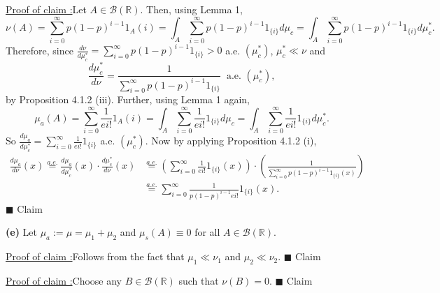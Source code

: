 \documentclass[12pt]{article}
\newcounter{ProofCounter}
\newcounter{ClaimCounter}[ProofCounter]
\newenvironment{claim}[1]{\stepcounter{ClaimCounter}\par\noindent\underline{Claim \theClaimCounter:}\space#1}{}
\newenvironment{claimproof}[1]{\par\noindent\underline{Proof of claim \theClaimCounter:}\space#1}{\hfill $\blacksquare$ Claim \theClaimCounter\vspace{5mm}}
\begin{document}
\begin{claimproof}
Let $A \in \mathcal{B}(\mathbb{R})$. Then, using Lemma 1,
\[ \nu(A) = \sum_{i=0}^{\infty}p(1-p)^{i-1}1_{A}(i) = \int_{A}\sum_{i=0}^{\infty}p(1-p)^{i-1}1_{\{i\}}d\mu_{c} =
\int_{A}\sum_{i=0}^{\infty}p(1-p)^{i-1}1_{\{i\}}d\mu_{c}^{*}. \]
Therefore, since $\frac{d\nu}{d\mu_{c}^{*}} = \sum_{i=0}^{\infty}p(1-p)^{i-1}1_{\{i\}} > 0$ a.e. $(\mu_{c}^{*})$, $\mu_{c}^{*} \ll \nu$ and 
\[ \frac{d\mu_{c}^{*}}{d\nu} = \frac{1}{\sum_{i=0}^{\infty}p(1-p)^{i-1}1_{\{i\}}} \ \text{ a.e. } (\mu_{c}^{*}), \]
by Proposition 4.1.2 (iii). Further, using Lemma 1 again,
\[ \mu_{a}(A) = \sum_{i=0}^{\infty}\frac{1}{ei!}1_{A}(i) = \int_{A}\sum_{i=0}^{\infty}\frac{1}{ei!}1_{\{i\}}d\mu_{c} =
\int_{A}\sum_{i=0}^{\infty}\frac{1}{ei!}1_{\{i\}}d\mu_{c}^{*}. \]
So $\frac{d\mu_{a}}{d\mu_{c}^{*}} = \sum_{i=0}^{\infty}\frac{1}{ei!}1_{\{i\}}$ a.e. $(\mu_{c}^{*})$. Now by applying Proposition 4.1.2 (i),
\begin{align*}
\frac{d\mu_{a}}{d\nu}(x) \stackrel{a.e.}{=} \frac{d\mu_{a}}{d\mu_{c}^{*}}(x)\cdot \frac{d\mu_{c}^{*}}{d\nu}(x) & \stackrel{a.e.}{=} 
\left( \sum_{i=0}^{\infty}\frac{1}{ei!}1_{\{i\}}(x) \right)\cdot \left( \frac{1}{\sum_{i=0}^{\infty}p(1-p)^{i-1}1_{\{i\}}(x)} \right) \\
& \stackrel{a.e.}{=} \sum_{i=0}^{\infty}\frac{1}{p(1-p)^{i-1}ei!}1_{\{i\}}(x).
\end{align*}
\end{claimproof}


{\bf (e)}
Let $\mu_{a} := \mu = \mu_{1} + \mu_{2}$ and $\mu_{s}(A) \equiv 0$ for all $A \in \mathcal{B}(\mathbb{R})$.

\begin{claimproof}
Follows from the fact that $\mu_{1} \ll \nu_{1}$ and $\mu_{2} \ll \nu_{2}$.
\end{claimproof}

\begin{claimproof}
Choose any $B \in \mathcal{B}(\mathbb{R})$ such that $\nu(B) = 0$.
\end{claimproof}
\end{document}
